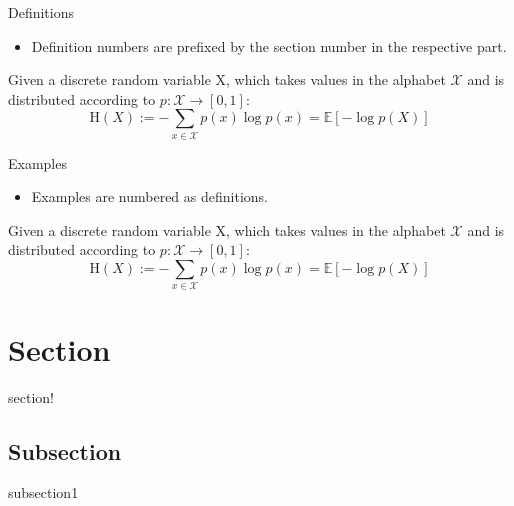 \documentclass[
14pt,notheorems,hyperref={pdfauthor=whatever}
]{beamer}
\begin{document}
\begin{frame}{}{Definitions}
    \begin{itemize}
        \item Definition numbers are prefixed by the section number in the respective part.
    \end{itemize}
     \begin{definition}
         Given a discrete random variable X, which takes values in the alphabet $\mathcal{X}$ and is distributed according to  $p:{\mathcal {X}}\to [0,1]$:
            \begin{equation}
                \mathrm {H} (X):=-\sum _{x\in {\mathcal {X}}}p(x)\log p(x)=\mathbb {E} [-\log p(X)]
            \end{equation}
    \end{definition}
\end{frame}

\begin{frame}{}{Examples}
    \begin{itemize}
        \item Examples are numbered as definitions.
    \end{itemize}
    \begin{examp}
         Given a discrete random variable X, which takes values in the alphabet $\mathcal{X}$ and is distributed according to  $p:{\mathcal {X}}\to [0,1]$:
            \begin{equation}
                \mathrm {H} (X):=-\sum _{x\in {\mathcal {X}}}p(x)\log p(x)=\mathbb {E} [-\log p(X)]
            \end{equation}
    \end{examp}
\end{frame}


\section{Section}
\begin{frame}{}
  \begin{block}{}
    section!
  \end{block}
\end{frame}

\subsection{Subsection}
\begin{frame}{}
  \begin{block}{}
    subsection1
  \end{block}
\end{frame}
\end{document}
